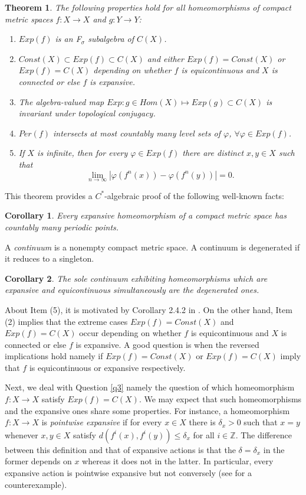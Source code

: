 \documentclass[11pt,letterpaper]{amsart}
\newtheorem{theorem}{Theorem}
\newtheorem{cor}{Corollary}
\begin{document}
\begin{theorem}
\label{perra}
The following properties hold for all homeomorphisms of compact metric spaces $f:X\to X$ and $g:Y\to Y$:
\begin{enumerate}
\item
$Exp(f)$ is an F$_\sigma$ subalgebra of $C(X)$.
\item
$Const(X)\subset Exp(f)\subset C(X)$ and
either $Exp(f)=Const(X)$ or $Exp(f)=C(X)$ depending on whether $f$ is equicontinuous and $X$ is connected or else $f$ is expansive.
\item
The algebra-valued map $Exp:g\in Hom(X)\mapsto Exp(g)\subset C(X)$ is invariant under topological conjugacy.
\item
$Per(f)$ intersects at most countably many level sets of $\varphi$, $\forall \varphi\in Exp(f)$.
\item
If $X$ is infinite, then
for every $\varphi\in Exp(f)$ there are distinct $x,y\in X$ such that
\begin{equation}
\label{robador}
\lim_{n\to\infty}|\varphi(f^n(x))-\varphi(f^n(y))|=0.
\end{equation}
\end{enumerate}
\end{theorem}

This theorem provides a $C^*$-algebraic proof of the following well-known facts:

\begin{cor}
\label{c}
Every expansive homeomorphism of a compact metric space has countably many periodic points.
\end{cor}

A {\em continuum} is a nonempty compact metric space. A continuum is degenerated if it reduces to a singleton.

\begin{cor}
\label{c1}
The sole continuum exhibiting homeomorphisms which are expansive and equicontinuous simultaneously are the degenerated ones.
\end{cor}

About Item (5), it is motivated by Corollary 2.4.2 in \cite{bs}.
On the other hand, Item (2) implies that
the extreme cases
$Exp(f)=Const(X)$ and $Exp(f)=C(X)$ occur depending on whether $f$ is equicontinuous
and $X$ is connected or else $f$ is expansive.
A good question is when the reversed implications hold namely
if $Exp(f)=Const(X)$ or $Exp(f)=C(X)$ imply that $f$ is equicontinuous or expansive respectively.

Next, we deal with Question \ref{q3} namely
the question of which homeomorphism $f:X\to X$ satisfy $Exp(f)=C(X)$.
We may expect that such homeomorphisms and the expansive ones share some properties.
For instance, a homeomorphism $f:X\to X$ 
is {\em pointwise expansive} \cite{r} if for every $x\in X$ there is $\delta_x>0$ such that
$x=y$ whenever $x,y\in X$ satisfy $d(f^i(x),f^i(y))\leq \delta_x$ for all $i\in\mathbb{Z}$.
The difference between this definition and that of expansive actions is that the $\delta=\delta_x$ in the former depends on $x$ whereas it does not in the latter.
In particular, every expansive action is pointwise expansive but not conversely (see \cite{r} for a counterexample).
\end{document}
